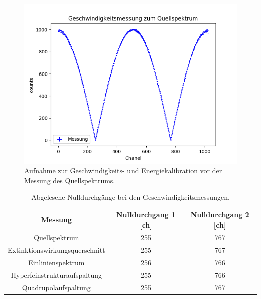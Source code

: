 \documentclass[12pt,a4paper]{article}
\begin{document}
\begin{figure}
\centering
\includegraphics[scale=0.8]{Bilder/Kalibration/Quellspektrum_rohdaten.png}
\caption{Aufnahme zur Geschwindigkeits- und Energiekalibration vor der Messung des Quellspektrums.}
\label{fig:KalibrationRohdaten_Beispiel}
\end{figure}

\begin{table}
\centering
\begin{tabular}{|c|c|c|}
\hline 
Messung & Nulldurchgang 1 [ch] & Nulldurchgang 2 [ch] \\ 
\hline 
Quellspektrum & 255 & 767 \\
\hline 
Extinktionswirkungsquerschnitt & 255 & 767 \\
\hline 
Einlinienspektrum & 256 & 766 \\
\hline 
Hyperfeinstrukturaufspaltung & 255 & 766 \\
\hline 
Quadrupolaufspaltung & 255 & 767 \\
\hline 
\end{tabular} 
\caption{Abgelesene Nulldurchgänge bei den Geschwindigkeitsmessungen.}
\label{tab:Kalibration_Nulldurchgänge}
\end{table}
\end{document}
